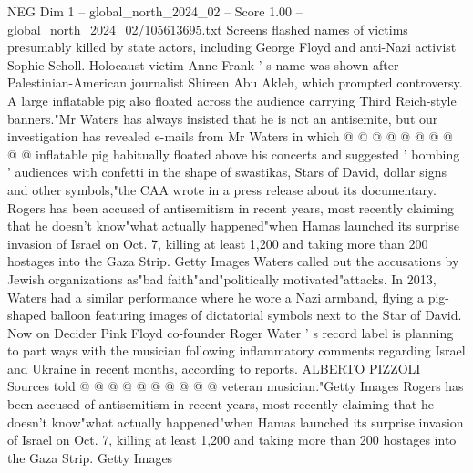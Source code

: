 \begin{textsample}{NEG Dim 1 – global\_north\_2024\_02 – Score 1.00 – global\_north\_2024\_02/105613695.txt}
Screens flashed names of victims presumably killed by state actors, including George Floyd and anti-Nazi activist Sophie Scholl.
Holocaust victim Anne Frank ' s name was shown after Palestinian-American journalist Shireen Abu Akleh, which prompted controversy.
A large inflatable pig also floated across the audience carrying Third Reich-style banners."Mr Waters has always insisted that he is not an antisemite, but our investigation has revealed e-mails from Mr Waters in which @ @ @ @ @ @ @ @ @ @ inflatable pig habitually floated above his concerts and suggested ' bombing ' audiences with confetti in the shape of swastikas, Stars of David, dollar signs and other symbols,"the CAA wrote in a press release about its documentary.
Rogers has been accused of antisemitism in recent years, most recently claiming that he doesn't know"what actually happened"when Hamas launched its surprise invasion of Israel on Oct. 7, killing at least 1,200 and taking more than 200 hostages into the Gaza Strip.
Getty Images Waters called out the accusations by Jewish organizations as"bad faith"and"politically motivated"attacks.
In 2013, Waters had a similar performance where he wore a Nazi armband, flying a pig-shaped balloon featuring images of dictatorial symbols next to the Star of David.
Now on Decider Pink Floyd co-founder Roger Water ' s record label is planning to part ways with the musician following inflammatory comments regarding Israel and Ukraine in recent months, according to reports.
ALBERTO PIZZOLI Sources told @ @ @ @ @ @ @ @ @ @ veteran musician."Getty Images Rogers has been accused of antisemitism in recent years, most recently claiming that he doesn't know"what actually happened"when Hamas launched its surprise invasion of Israel on Oct. 7, killing at least 1,200 and taking more than 200 hostages into the Gaza Strip.
Getty Images

\end{textsample}
